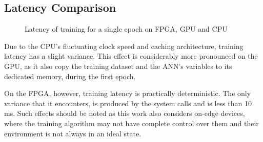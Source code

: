 \subsection{Latency Comparison}

\begin{figure}[H]
    \center
    \caption[FPGA, GPU, CPU latency comparison]{Latency of training for a single epoch on FPGA, GPU and CPU}
    \label{fig: FPGA CPU GPU latency}
\end{figure}

Due to the CPU's fluctuating clock speed and caching architecture, training latency has a slight variance. This effect is considerably more pronounced on the GPU, as it also copy the training dataset and the ANN's variables to its dedicated memory, during the first epoch. %

On the FPGA, however, training latency is practically deterministic. The only variance that it encounters, is produced by the system calls and is less than 10 ms. Such effects should be noted as this work also considers on-edge devices, where the training algorithm may not have complete control over them and their environment is not always in an ideal state. %

